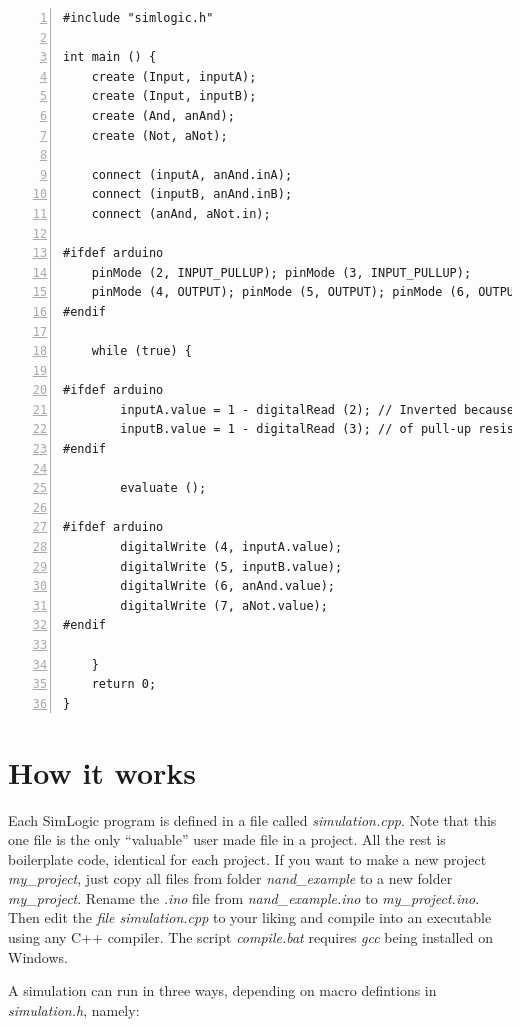 \documentclass[a4paper,11pt]{article}
\begin{document}
\begin{lstlisting}[caption={Nand circuit with Arduino I/O added}, numbers=left]
#include "simlogic.h"

int main () {    
    create (Input, inputA);
    create (Input, inputB);
    create (And, anAnd);
    create (Not, aNot);

    connect (inputA, anAnd.inA);
    connect (inputB, anAnd.inB);
    connect (anAnd, aNot.in);

#ifdef arduino
    pinMode (2, INPUT_PULLUP); pinMode (3, INPUT_PULLUP);
    pinMode (4, OUTPUT); pinMode (5, OUTPUT); pinMode (6, OUTPUT); pinMode (7, OUTPUT);
#endif

    while (true) {
    
#ifdef arduino
        inputA.value = 1 - digitalRead (2); // Inverted because
        inputB.value = 1 - digitalRead (3); // of pull-up resistors
#endif

        evaluate ();
        
#ifdef arduino
        digitalWrite (4, inputA.value);
        digitalWrite (5, inputB.value);
        digitalWrite (6, anAnd.value);
        digitalWrite (7, aNot.value);
#endif 
       
    }    
    return 0;
}
\end{lstlisting}

\section{How it works}

Each SimLogic program is defined in a file called \emph{simulation.cpp}. Note that this one file is the only ``valuable'' user made file in a project. All the rest is boilerplate code, identical for each project. If you want to make a new project \emph{my\_project}, just copy all files from folder \emph{nand\_example} to a new folder \emph{my\_project}. Rename the \emph{.ino} file from \emph{nand\_example.ino} to \emph{my\_project.ino}.
Then edit the \emph{file simulation.cpp} to your liking and compile into an executable using any C++ compiler. The script \emph{compile.bat} requires \emph{gcc} being installed on Windows.

A simulation can run in three ways, depending on macro defintions in \emph{simulation.h}, namely:
\end{document}

